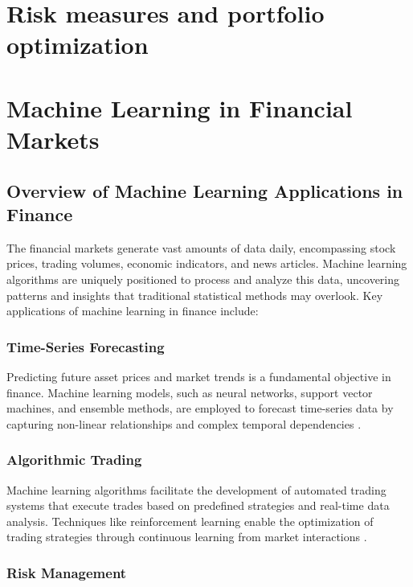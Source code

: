 \section{Risk measures and portfolio optimization}

\section{Machine Learning in Financial Markets}

\subsection{Overview of Machine Learning Applications in Finance}

The financial markets generate vast amounts of data daily, encompassing stock prices, trading volumes, economic indicators, and news articles. Machine learning algorithms are uniquely positioned to process and analyze this data, uncovering patterns and insights that traditional statistical methods may overlook. Key applications of machine learning in finance include:

\subsubsection{Time-Series Forecasting}

Predicting future asset prices and market trends is a fundamental objective in finance. Machine learning models, such as neural networks, support vector machines, and ensemble methods, are employed to forecast time-series data by capturing non-linear relationships and complex temporal dependencies \cite{sezer2020financial}.

\subsubsection{Algorithmic Trading}

Machine learning algorithms facilitate the development of automated trading systems that execute trades based on predefined strategies and real-time data analysis. Techniques like reinforcement learning enable the optimization of trading strategies through continuous learning from market interactions \cite{nevmyvaka2006reinforcement}.

\subsubsection{Risk Management}

